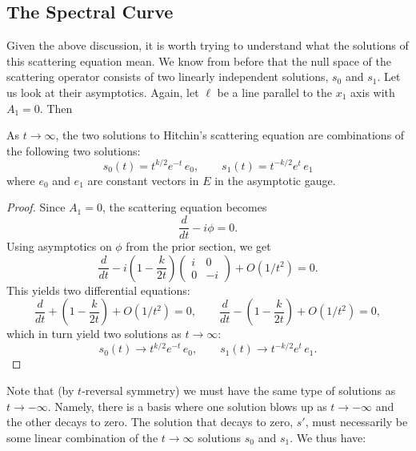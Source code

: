 	\subsection{The Spectral Curve}
	Given the above discussion, it is worth trying to understand what the solutions of this scattering equation mean. We know from before that the null space of the scattering operator consists of two linearly independent solutions, $s_0$ and $s_1$. Let us look at their asymptotics. Again, let $\ell$ be a line parallel to the $x_1$ axis with $A_1 = 0$. Then
	\begin{prop}
		As $t \to \infty$, the two solutions to Hitchin's scattering equation are combinations of the following two solutions:
		\begin{equation}
			s_0(t) = t^{k/2} e^{-t}\, e_0, \qquad s_1(t) = t^{-k/2} e^{t}\, e_1
		\end{equation}
		where $e_0$ and $e_1$ are constant vectors in $E$ in the asymptotic gauge.
	\end{prop}
	\begin{proof}
		Since $A_1 = 0$, the scattering equation becomes
		\begin{equation}
			\frac{d}{dt} - i \phi = 0.
		\end{equation}
		Using asymptotics on $\phi$ from the prior section, we get
		\begin{equation}
			\frac{d}{dt} - i \left(1 - \frac{k}{2t} \right)\begin{pmatrix}
				i & 0\\
				0 & -i
			\end{pmatrix} + O(1/t^2) = 0.
		\end{equation}
		This yields two differential equations:
		\begin{equation}
			\frac{d}{dt} + \left(1 - \frac{k}{2t}\right) + O(1/t^2) = 0, \qquad \frac{d}{dt} - \left(1 - \frac{k}{2t}\right) + O(1/t^2) = 0,
		\end{equation}
		which in turn yield two solutions as $t \to \infty$:
		\begin{equation}
			s_0(t) \to t^{k/2} e^{-t}\, e_0, \qquad s_1(t) \to t^{-k/2} e^{t}\, e_1.
		\end{equation}
	\end{proof}
	Note that (by $t$-reversal symmetry) we must have the same type of solutions as $t \to -\infty$. Namely, there is a basis where one solution blows up as $t \to -\infty$ and the other decays to zero. The solution that decays to zero, $s'$, must necessarily be some linear combination of the $t\to \infty$ solutions $s_0$ and $s_1$. We thus have:

